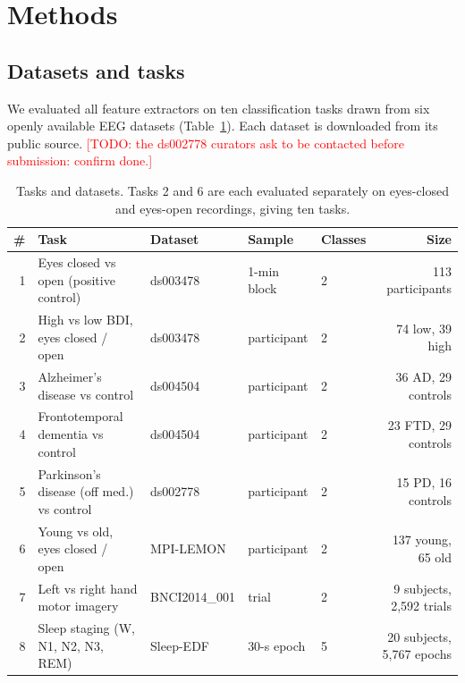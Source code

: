 \documentclass[11pt]{article}
\newcommand{\todo}[1]{\textcolor{red}{[TODO: #1]}}
\begin{document}
\section{Methods}

\subsection{Datasets and tasks}
We evaluated all feature extractors on ten classification tasks drawn from six openly
available EEG datasets (Table~\ref{tab:tasks}). Each dataset is downloaded from its public
source. \todo{the ds002778 curators ask to be contacted before submission: confirm done.}

\begin{table}[t]
\centering\footnotesize\setlength{\tabcolsep}{4pt}
\caption{Tasks and datasets. Tasks 2 and 6 are each evaluated separately on eyes-closed and
eyes-open recordings, giving ten tasks.}
\label{tab:tasks}
\begin{tabular}{@{}rllllr@{}}
\toprule
\# & Task & Dataset & Sample & Classes & Size \\
\midrule
1 & Eyes closed vs open (positive control) & ds003478 & 1-min block & 2 & 113 participants \\
2 & High vs low BDI, eyes closed / open & ds003478 & participant & 2 & 74 low, 39 high \\
3 & Alzheimer's disease vs control & ds004504 & participant & 2 & 36 AD, 29 controls \\
4 & Frontotemporal dementia vs control & ds004504 & participant & 2 & 23 FTD, 29 controls \\
5 & Parkinson's disease (off med.) vs control & ds002778 & participant & 2 & 15 PD, 16 controls \\
6 & Young vs old, eyes closed / open & MPI-LEMON & participant & 2 & 137 young, 65 old \\
7 & Left vs right hand motor imagery & BNCI2014\_001 & trial & 2 & 9 subjects, 2,592 trials \\
8 & Sleep staging (W, N1, N2, N3, REM) & Sleep-EDF & 30-s epoch & 5 & 20 subjects, 5,767 epochs \\
\bottomrule
\end{tabular}
\end{table}
\end{document}
